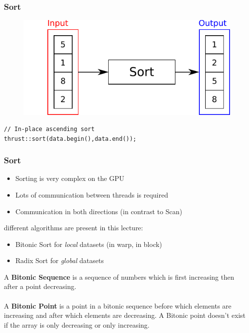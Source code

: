 \documentclass[aspectratio=169]{beamer}
\begin{document}
\begin{frame}[fragile]
\frametitle{Sort}
\begin{figure}
	\centering
	\includegraphics[height=0.6\textheight]{o_sort}
\end{figure}

\begin{lstlisting}
// In-place ascending sort
thrust::sort(data.begin(),data.end());
\end{lstlisting}
\end{frame}

\frame
{
	\frametitle{Sort}
	\begin{itemize}
		\item Sorting is very complex on the GPU
		\item Lots of communication between threads is required
		\item Communication in both directions (in contrast to Scan)
	\end{itemize}
 different algorithms are present in this lecture:
\begin{itemize}
	\item<2-> Bitonic Sort for \textit{local} datasets (in warp, in block)
	\item<2-> Radix Sort for \textit{global} datasets
\end{itemize}
}

\frame
{
	\begin{mdframed}[frametitle={Bitonic Sequence}]
		A \textbf{Bitonic Sequence} is a sequence of numbers which is first increasing then after a point decreasing.
		\\ \\
		A \textbf{Bitonic Point} is a point in a bitonic sequence before which elements are increasing and after which elements are decreasing. A Bitonic point doesn’t exist if the array is only decreasing or only increasing.
	\end{mdframed}
}
\end{document}
